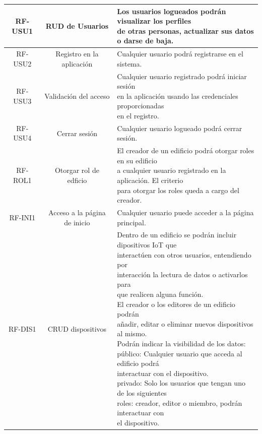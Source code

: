 \documentclass[12pt, a4paper, twoside]{article}
\begin{document}
{\begin{longtable}{ |c|c|l| }
  RF-USU1 & RUD de Usuarios 
  & \makecell[l]{Los usuarios logueados podrán visualizar los perfiles \\
  de otras personas, actualizar sus datos o darse de baja. 
  }\\ \hline
  RF-USU2 & Registro en la aplicación 
  & Cualquier usuario podrá registrarse en el sistema. 
  \\ \hline 
  RF-USU3 & Validación del acceso 
  & \makecell[l]{Cualquier usuario registrado podrá iniciar sesión \\
  en la aplicación usando las credenciales proporcionadas \\
  en el registro.
   } \\ \hline
  RF-USU4 & Cerrar sesión & Cualquier usuario logueado podrá cerrar sesión. \\ \hline


  RF-ROL1 & Otorgar rol de edficio 
  & \makecell[l]{El creador de un edificio podrá otorgar roles en su edificio \\
  a cualquier usuario registrado en la aplicación. El criterio \\
  para otorgar los roles queda a cargo del creador.
  } \\ \hline
 
  RF-INI1 & Acceso a la página de inicio & Cualquier usuario puede acceder a la página principal. \\ \hline
 
  RF-DIS1 & CRUD dispositivos 
  & \makecell[l]{Dentro de un edificio se podrán incluir dipositivos IoT que \\
    interactúen con otros usuarios, entendiendo por\\
    interacción la lectura de datos o activarlos para\\
    que realicen alguna función.\\
    El creador o los editores de un edificio podrán \\ 
    añadir, editar o eliminar nuevos dispositivos al mismo. \\
    Podrán indicar la visibilidad de los datos: \\
    público: Cualquier usuario que acceda al edificio podrá \\
    interactuar con el dispositivo. \\
    privado: Solo los usuarios que tengan uno de los siguientes\\ 
    roles: creador, editor o miembro, podrán interactuar con \\
    el dispositivo.
  } \\ \hline
\end{longtable}
}
\end{document}
